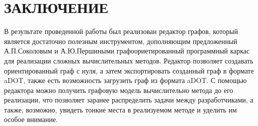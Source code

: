 \chapter*{ЗАКЛЮЧЕНИЕ}\label{chap_conclusion}

В результате проведенной работы был реализован редактор графов, который является достаточно полезным инструментом, дополняющим предложенный А.П.Соколовым и А.Ю.Першиными графоориетированный программный каркас для реализации сложных вычислительных методов. Редактор позволяет создавать ориентированный граф с нуля, а затем экспортировать созданный граф в формате aDOT, также есть возможность загрузить граф из формата aDOT. С помощью редактора можно получить графовую модель вычислительно метода до его реализации, что позволяет заранее распределить задачи между разработчиками, а также, возможно, увидеть тонкие места в реализуемом методе и уделить им особое внимание. 

